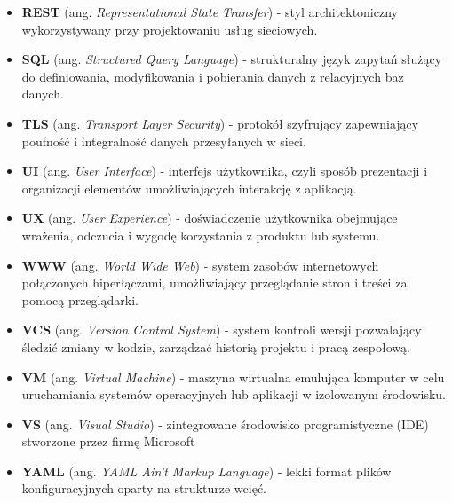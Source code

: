 \begin{itemize}
  \item \textbf{REST} (ang. \textit{Representational State Transfer}) - styl architektoniczny wykorzystywany przy projektowaniu usług sieciowych.
  \item \textbf{SQL} (ang. \textit{Structured Query Language}) - strukturalny język zapytań służący do definiowania, modyfikowania i pobierania danych z relacyjnych baz danych.
  \item \textbf{TLS} (ang. \textit{Transport Layer Security}) - protokół szyfrujący zapewniający poufność i integralność danych przesyłanych w sieci.
  \item \textbf{UI} (ang. \textit{User Interface}) - interfejs użytkownika, czyli sposób prezentacji i organizacji elementów umożliwiających interakcję z aplikacją.
  \item \textbf{UX} (ang. \textit{User Experience}) - doświadczenie użytkownika obejmujące wrażenia, odczucia i wygodę korzystania z produktu lub systemu.
  \item \textbf{WWW} (ang. \textit{World Wide Web}) - system zasobów internetowych połączonych hiperłączami, umożliwiający przeglądanie stron i treści za pomocą przeglądarki.
  \item \textbf{VCS} (ang. \textit{Version Control System}) - system kontroli wersji pozwalający śledzić zmiany w kodzie, zarządzać historią projektu i pracą zespołową.
  \item \textbf{VM} (ang. \textit{Virtual Machine}) - maszyna wirtualna emulująca komputer w celu uruchamiania systemów operacyjnych lub aplikacji w izolowanym środowisku.
  \item \textbf{VS} (ang. \textit{Visual Studio}) - zintegrowane środowisko programistyczne (IDE) stworzone przez firmę Microsoft
  \item \textbf{YAML} (ang. \textit{YAML Ain't Markup Language}) - lekki format plików konfiguracyjnych oparty na strukturze wcięć.
\end{itemize}
